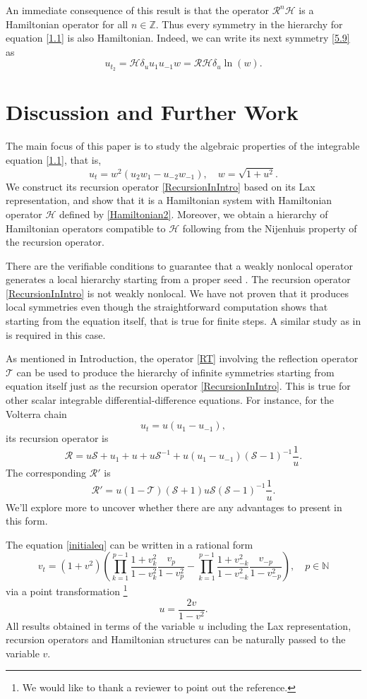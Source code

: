 \documentclass[fleqn,11pt,twoside]{article}
\newcommand\cH{{\mathcal H}}
\newcommand\cS{{\mathcal S}}
\newcommand\cT{{\mathcal T}}
\theoremstyle{definition}
\begin{document}
An immediate consequence of this result is that the operator
$\mathcal{R}^n\mathcal{H}$ is a Hamiltonian operator for all
$n \in \mathbb{Z}$. Thus every symmetry in the hierarchy for equation \eqref{1.1} is also Hamiltonian. Indeed, we can write its next symmetry \eqref{5.9} as
$$u_{t_2}=\mathcal{H} \delta_u u_1 u_{-1} w = \mathcal{R}\mathcal{H} \delta_u \ln(w) .$$

\section{Discussion and Further Work}\label{Sec4}
The main focus of this paper is to study the algebraic properties of the integrable equation
\eqref{1.1}, that is,
	\begin{equation*}
		u_t = w^2\left(u_2 w_1 - u_{-2}w_{-1}\right), \quad w = \sqrt{1+u^2} .
		\label{finale}
	\end{equation*}
We construct its recursion operator \eqref{RecursionInIntro} based on its Lax representation, and show that it is a Hamiltonian system with Hamiltonian operator $\cH$ defined by \eqref{Hamiltonian2}. Moreover, we obtain a hierarchy of Hamiltonian operators compatible  to $\cH$ following from the Nijenhuis property of the recursion operator.

There are the verifiable conditions to guarantee that a weakly nonlocal operator generates a local hierarchy starting from a proper seed \cite{82}. The recursion operator \eqref{RecursionInIntro} is not weakly nonlocal. We have not proven that it produces local symmetries even though the straightforward computation shows that starting from the equation itself, that is true for finite steps. A similar study as in \cite{4} is required in this case.

As mentioned in Introduction, the operator \eqref{RT} involving the reflection operator $\cT$ can be used to produce the hierarchy of infinite symmetries starting from equation itself just as  the recursion operator \eqref{RecursionInIntro}. This is true for other scalar integrable differential-difference equations. For instance, for the Volterra chain
$$
u_t=u (u_1-u_{-1}),
$$
its recursion operator is
$$
\mathcal{R}= u \cS +u_1 +u +u \cS^{-1} +u (u_1-u_{-1}) (\cS-1)^{-1} \frac{1}{u} .
$$
The corresponding $\mathcal{R}'$ is
$$
\mathcal{R}'= u (1-\cT) (\cS +1) u \cS (\cS-1)^{-1} \frac{1}{u}.
$$
We'll explore more to uncover whether there are any advantages to present in this form.

The equation \eqref{initialeq} can be written in a rational form
\begin{equation*}
 v_t=(1+v^2) \left( \prod_{k=1}^{p-1}\frac{1+v_k^2}{1-v_k^2} \frac{v_p}{1-v_p^2}-\prod_{k=1}^{p-1}\frac{1+v_{-k}^2}{1-v_{-k}^2}
 \frac{v_{-p}}{1-v_{-p}^2}\right),  \quad  p\in \mathbb{N}
\end{equation*}
via a point transformation \cite{96}\footnote{We would like to thank a reviewer to point out the reference.}
\begin{equation*}
 u = \frac{2 v}{1-v^2}.
\end{equation*}
All results obtained in terms of the variable $u$ including the Lax representation, recursion operators and Hamiltonian structures can be naturally passed to the variable $v$.
\end{document}

